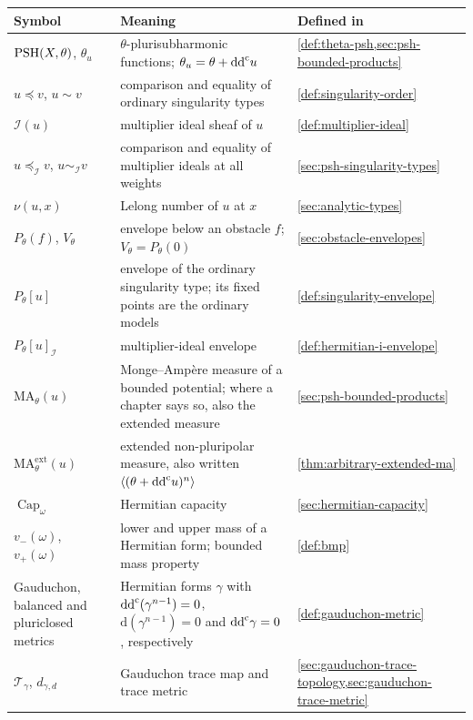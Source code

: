 \begin{center}
\small
\renewcommand{\arraystretch}{1.15}
\begin{tabular}{@{}>{\raggedright\arraybackslash}p{}>{\raggedright\arraybackslash}p{}>{\raggedright\arraybackslash}p{}@{}}
\toprule
Symbol & Meaning & Defined in\\
\midrule
$\mathrm{PSH}(X,\theta)$, $\theta_u$ & $\theta$-plurisubharmonic functions; $\theta_u=\theta+\mathrm{dd}^{\mathrm{c}} u$ & \cref{def:theta-psh,sec:psh-bounded-products}\\
$u\preceq v$, $u\sim v$ & comparison and equality of ordinary singularity types & \cref{def:singularity-order}\\
$\mathcal I(u)$ & multiplier ideal sheaf of $u$ & \cref{def:multiplier-ideal}\\
$u\preceq_{\mathcal I}v$, $u\sim_{\mathcal I}v$ & comparison and equality of multiplier ideals at all weights & \cref{sec:psh-singularity-types}\\
$\nu(u,x)$ & Lelong number of $u$ at $x$ & \cref{sec:analytic-types}\\
$P_\theta(f)$, $V_\theta$ & envelope below an obstacle $f$; $V_\theta=P_\theta(0)$ & \cref{sec:obstacle-envelopes}\\
$P_\theta[u]$ & envelope of the ordinary singularity type; its fixed points are the ordinary models & \cref{def:singularity-envelope}\\
$P_\theta[u]_{\mathcal I}$ & multiplier-ideal envelope & \cref{def:hermitian-i-envelope}\\
$\mathrm{MA}_\theta(u)$ & Monge--Amp\`ere measure of a bounded potential; where a chapter says so, also the extended measure & \cref{sec:psh-bounded-products}\\
$\mathrm{MA}^{\mathrm{ext}}_\theta(u)$ & extended non-pluripolar measure, also written $\langle(\theta+\mathrm{dd}^{\mathrm{c}} u)^n\rangle$ & \cref{thm:arbitrary-extended-ma}\\
$\operatorname{Cap}_\omega$ & Hermitian capacity & \cref{sec:hermitian-capacity}\\
$v_-(\omega)$, $v_+(\omega)$ & lower and upper mass of a Hermitian form; bounded mass property & \cref{def:bmp}\\
Gauduchon, balanced and pluriclosed metrics & Hermitian forms $\gamma$ with $\mathrm{dd}^{\mathrm{c}}(\gamma^{n-1})=0$, $\mathrm d(\gamma^{n-1})=0$ and $\mathrm{dd}^{\mathrm{c}}\gamma=0$, respectively & \cref{def:gauduchon-metric}\\
$\mathcal T_\gamma$, $d_{\gamma,d}$ & Gauduchon trace map and trace metric & \cref{sec:gauduchon-trace-topology,sec:gauduchon-trace-metric}\\

\end{tabular}
\end{center}
